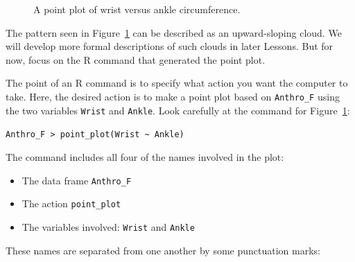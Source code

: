 \documentclass[
  letterpaper,
  DIV=11,
  numbers=noendperiod,
  oneside]{scrartcl}
\providecommand{\tightlist}{%
  \setlength{\itemsep}{0pt}\setlength{\parskip}{0pt}}\usepackage{longtable,booktabs,array}
\begin{document}
\begin{figure}[H]


\caption{\label{fig-wrist-ankle}A point plot of wrist versus ankle
circumference.}

\end{figure}%

The pattern seen in Figure~\ref{fig-wrist-ankle} can be described as an
upward-sloping cloud. We will develop more formal descriptions of such
clouds in later Lessons. But for now, focus on the R command that
generated the point plot.

The point of an R command is to specify what action you want the
computer to take. Here, the desired action is to make a point plot based
on \texttt{Anthro\_F} using the two variables \texttt{Wrist} and
\texttt{Ankle}. Look carefully at the command for
Figure~\ref{fig-wrist-ankle}:

\texttt{Anthro\_F\ \textbar{}\textgreater{}\ point\_plot(Wrist\ \textasciitilde{}\ Ankle)}

The command includes all four of the names involved in the plot:

\begin{itemize}
\tightlist
\item
  The data frame \texttt{Anthro\_F}
\item
  The action \texttt{point\_plot}
\item
  The variables involved: \texttt{Wrist} and \texttt{Ankle}
\end{itemize}

These names are separated from one another by some punctuation marks:
\end{document}
